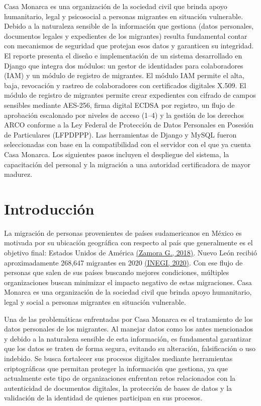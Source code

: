 \documentclass[10pt,letterpaper]{report}
\newcommand{\citeref}[2]{\hyperlink{ref:#1}{(#2)}}
\begin{document}
Casa Monarca es una organización de la sociedad civil que brinda apoyo humanitario, legal y psicosocial a personas migrantes en situación vulnerable. Debido a la naturaleza sensible de la información que gestiona (datos personales, documentos legales y expedientes de los migrantes) resulta fundamental contar con mecanismos de seguridad que protejan esos datos y garanticen su integridad. El reporte presenta el diseño e implementación de un sistema desarrollado en Django que integra dos módulos: un gestor de identidades para colaboradores (IAM) y un módulo de registro de migrantes. El módulo IAM permite el alta, baja, revocación y rastreo de colaboradores con certificados digitales X.509. El módulo de registro de migrantes permite crear expedientes con cifrado de campos sensibles mediante AES-256, firma digital ECDSA por registro, un flujo de aprobación escalonado por niveles de acceso (1--4) y la gestión de los derechos ARCO conforme a la Ley Federal de Protección de Datos Personales en Posesión de Particulares (LFPDPPP). Las herramientas de Django y MySQL fueron seleccionadas con base en la compatibilidad con el servidor con el que ya cuenta Casa Monarca. Los siguientes pasos incluyen el despliegue del sistema, la capacitación del personal y la migración a una autoridad certificadora de mayor madurez.

\newpage

\chapter{Introducción}

La migración de personas provenientes de países sudamericanos en México es motivada por su ubicación geográfica con respecto al país que generalmente es el objetivo final: Estados Unidos de América \citeref{zamora2018}{Zamora G., 2018}. Nuevo León recibió aproximadamente 268,647 migrantes en 2020 \citeref{inegi2020}{INEGI, 2020}. Con ese flujo de personas que salen de sus países buscando mejores condiciones, múltiples organizaciones buscan minimizar el impacto negativo de estas migraciones. Casa Monarca es una organización de la sociedad civil que brinda apoyo humanitario, legal y social a personas migrantes en situación vulnerable.

Una de las problemáticas enfrentadas por Casa Monarca es el tratamiento de los datos personales de los migrantes. Al manejar datos como los antes mencionados y debido a la naturaleza sensible de esta información, es fundamental garantizar que los datos se traten de forma segura, evitando su alteración, falsificación o uso indebido. Se busca fortalecer sus procesos digitales mediante herramientas criptográficas que permitan proteger la información que gestiona, ya que actualmente este tipo de organizaciones enfrentan retos relacionados con la autenticidad de documentos digitales, la protección de bases de datos y la validación de la identidad de quienes participan en sus procesos.
\end{document}
